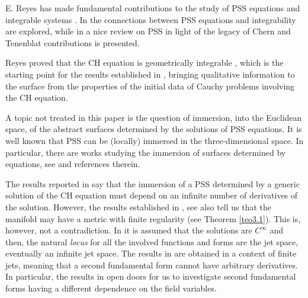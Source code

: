 \documentclass{cimart}
\begin{document}
\begin{remark}
E. Reyes has made fundamental contributions to the study of PSS equations and integrable systems \cite{benson,reyes2000jmp,reyes2000,reyes2002,reyes2006-sel,reyes2006-jde,reyes2011}. In \cite{reyes2006-sel} the connections between PSS equations and integrability are explored, while in \cite{reyes2011} a nice review on PSS in light of the legacy of Chern and Tenenblat contributions is presented. 
\end{remark}
 
\begin{remark}
Reyes proved that the CH equation is geometrically integrable \cite{reyes2002}, which is the starting point for the results established in \cite{freire-ch}, bringing qualitative information to the surface from the properties of the initial data of Cauchy problems involving the CH equation. 
\end{remark}

\begin{remark}
A topic not treated in this paper is the question of immersion, into the Euclidean space, of the abstract surfaces determined by the solutions of PSS equations. It is well known that PSS can be (locally) immersed in the three-dimensional space. In particular, there are works studying the immersion of surfaces determined by equations, see \cite{tarcisio,freire-dp,kah-book, kah-cag, kah,reyes2000jmp} and references therein. 
\end{remark}

\begin{remark}
The results reported in \cite{tarcisio} say that the immersion of a PSS determined by a generic solution of the CH equation must depend on an infinite number of derivatives of the solution. However, the results established in \cite{freire-ch}, see also \cite{nilay,freire-dp,freire-arxiv} tell us that the manifold may have a metric with finite regularity (see Theorem \ref{teo3.1}). This is, however, not a contradiction. In \cite{tarcisio} it is assumed that the solutions are $C^\infty$ and then, the natural {\it locus} for all the involved functions and forms are the jet space, eventually an infinite jet space. The results in \cite{freire-ch} are obtained in a context of finite jets, meaning that a second fundamental form cannot have arbitrary derivatives. In particular, the results in \cite{freire-ch} open doors for us to investigate second fundamental forms having a different dependence on the field variables. 
\end{remark}
\end{document}
